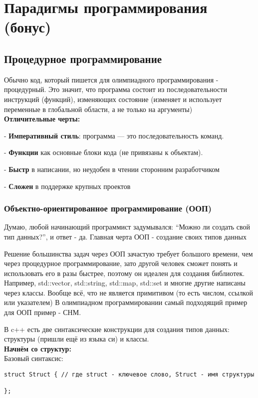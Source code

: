 \section{Парадигмы программирования (бонус)}

\subsection{Процедурное программирование}
Обычно код, который пишется для олимпиадного программирования - процедурный.
Это значит, что программа состоит из последовательности инструкций (функций), изменяющих состояние
(изменяет и использует переменные в глобальной области, а не только на аргументы)\\
\textbf{Отличительные черты:}

- \textbf{Императивный стиль}: программа — это последовательность команд.

- \textbf{Функции} как основные блоки кода (не привязаны к объектам).

- \textbf{Быстр} в написании, но неудобен в чтении сторонним разработчиком

- \textbf{Сложен} в поддержке крупных проектов

\subsubsection{Объектно-ориентированное программирование (ООП)}
Думаю, любой начинающий программист задумывался: ``Можно ли создать свой тип данных?'', и ответ - да.
Главная черта ООП - создание своих типов данных

Решение большинства задач через ООП зачастую требует большого времени, чем через процедурное программирование,
зато другой человек сможет понять и использовать его в разы быстрее, поэтому он идеален для создания библиотек.
Например, std::vector, std::string, std::map, std::set и многие другие написаны через классы.
Вообще всё, что не является примитивом (то есть числом, ссылкой или указателем)
В олимпиадном программировании самый подходящий пример для ООП пример - СНМ.

В c++ есть две синтаксические конструкции для создания типов данных: структуры (пришли ещё из языка си) и классы.\\
\textbf{Начнём со структур:}\\
Базовый синтаксис:

\begin{verbatim}
struct Struct { // где struct - ключевое слово, Struct - имя структуры

};
\end{verbatim}